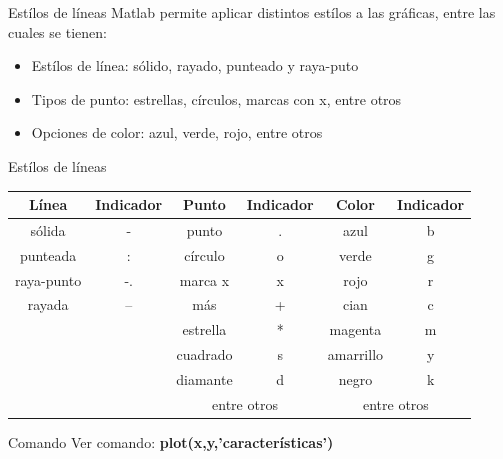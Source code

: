 \documentclass{bredelebeamer}
\begin{document}
\begin{frame}{Estílos de líneas}
Matlab permite aplicar distintos estílos a las gráficas, entre las cuales se tienen:
\begin{itemize}
\item Estílos de línea: sólido, rayado, punteado y raya-puto
\item Tipos de punto: estrellas, círculos, marcas con x, entre otros
\item Opciones de color: azul, verde, rojo, entre otros
\end{itemize}
\end{frame}

\begin{frame}{Estílos de líneas}
\begin{table}[]
\centering
\begin{tabular}{|c|c|c|c|c|c|}
\hline
Línea      & Indicador & Punto          & Indicador       & Color           & Indicador      \\ \hline
sólida     & -         & punto          & .               & azul            & b              \\ \hline
punteada   & :         & círculo        & o               & verde           & g              \\ \hline
raya-punto & -.        & marca x        & x               & rojo            & r              \\ \hline
rayada     & --        & más            & +               & cian            & c              \\ \hline
           &           & estrella       & *               & magenta         & m              \\ \hline
           &           & cuadrado       & s               & amarrillo       & y              \\ \hline
           &           & diamante       & d               & negro           & k              \\ \hline
           &           & \multicolumn{2}{c|}{entre otros} & \multicolumn{2}{c|}{entre otros} \\ \hline
\end{tabular}
\end{table}
\begin{exampleblock}{Comando}
Ver comando: \textbf{plot(x,y,'características')}
\end{exampleblock}
\end{frame}
\end{document}
